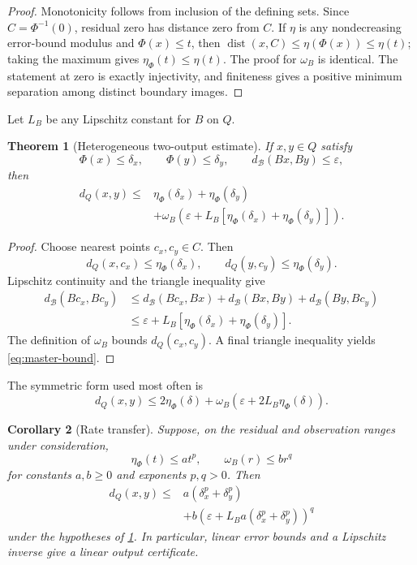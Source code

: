 \documentclass[11pt]{article}
\newtheorem{theorem}{Theorem}[section]
\newtheorem{corollary}[theorem]{Corollary}
\theoremstyle{definition}
\theoremstyle{remark}
\numberwithin{equation}{section}
\newcommand{\dist}{\operatorname{dist}}
\newcommand{\cB}{\mathcal B}
\newcommand{\eps}{\varepsilon}
\begin{document}
\begin{proof}
Monotonicity follows from inclusion of the defining sets.  Since $C=\Phi^{-1}(0)$, residual zero has distance zero from $C$.  If $\eta$ is any nondecreasing error-bound modulus and $\Phi(x)\le t$, then $\dist(x,C)\le\eta(\Phi(x))\le\eta(t)$; taking the maximum gives $\eta_\Phi(t)\le\eta(t)$.  The proof for $\omega_B$ is identical.  The statement at zero is exactly injectivity, and finiteness gives a positive minimum separation among distinct boundary images.
\end{proof}

Let $L_B$ be any Lipschitz constant for $B$ on $Q$.

\begin{theorem}[Heterogeneous two-output estimate]\label{thm:master-bound}
If $x,y\in Q$ satisfy
\[
 \Phi(x)\le\delta_x,\qquad \Phi(y)\le\delta_y,
 \qquad d_{\cB}(Bx,By)\le\eps,
\]
then
\begin{equation}\label{eq:master-bound}
\begin{split}
 d_Q(x,y)\le{}&\eta_\Phi(\delta_x)+\eta_\Phi(\delta_y)\\
 &+\omega_B\!\left(
 \eps+L_B[\eta_\Phi(\delta_x)+\eta_\Phi(\delta_y)]
 \right).
\end{split}
\end{equation}
\end{theorem}

\begin{proof}
Choose nearest points $c_x,c_y\in C$.  Then
\[
 d_Q(x,c_x)\le\eta_\Phi(\delta_x),\qquad
 d_Q(y,c_y)\le\eta_\Phi(\delta_y).
\]
Lipschitz continuity and the triangle inequality give
\begin{align*}
 d_{\cB}(Bc_x,Bc_y)
 &\le d_{\cB}(Bc_x,Bx)+d_{\cB}(Bx,By)+d_{\cB}(By,Bc_y)\\
 &\le \eps+L_B[\eta_\Phi(\delta_x)+\eta_\Phi(\delta_y)].
\end{align*}
The definition of $\omega_B$ bounds $d_Q(c_x,c_y)$.  A final triangle inequality yields \eqref{eq:master-bound}.
\end{proof}

The symmetric form used most often is
\begin{equation}\label{eq:symmetric-bound}
 d_Q(x,y)\le
 2\eta_\Phi(\delta)+
 \omega_B\!\left(\eps+2L_B\eta_\Phi(\delta)\right).
\end{equation}

\begin{corollary}[Rate transfer]\label{cor:rate-transfer}
Suppose, on the residual and observation ranges under consideration,
\[
 \eta_\Phi(t)\le a t^p,
 \qquad
 \omega_B(r)\le b r^q
\]
for constants $a,b\ge0$ and exponents $p,q>0$.  Then
\[
\begin{split}
 d_Q(x,y)\le{}&a(\delta_x^p+\delta_y^p)\\
 &+b\!\left(\eps+L_Ba(\delta_x^p+\delta_y^p)\right)^q
\end{split}
\]
under the hypotheses of \cref{thm:master-bound}.  In particular, linear
error bounds and a Lipschitz inverse give a linear output certificate.
\end{corollary}
\end{document}
